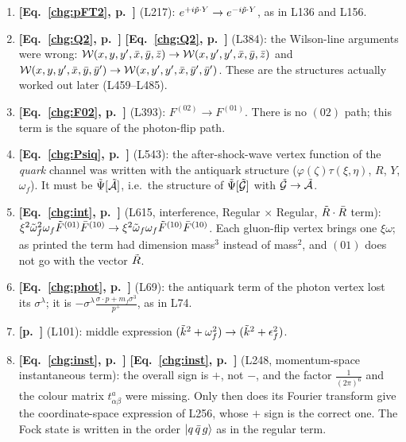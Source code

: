 \documentclass[9pt]{article}
\numberwithin{equation}{section}
\begin{document}
\begin{enumerate}
    \item \textbf{[Eq.~\eqref{chg:pFT2}, p.~\pageref{chg:pFT2}]} (L217): $e^{+i\Tilde{p}\cdot Y}\rightarrow e^{-i\Tilde{p}\cdot Y}$, as in L136 and L156.
    \item \textbf{[Eq.~\eqref{chg:Q2}, p.~\pageref{chg:Q2}]} \textbf{[Eq.~\eqref{chg:Q2}, p.~\pageref{chg:Q2}]} (L384): the Wilson-line arguments were wrong: $\mathcal{W}(x,y,y',\Bar{x},\Bar{y},\Bar{z})\rightarrow\mathcal{W}(x,y',y',\Bar{x},\Bar{y},\Bar{z})$ and $\mathcal{W}(x,y,y',\Bar{x},\Bar{y},\Bar{y}')\rightarrow\mathcal{W}(x,y',y',\Bar{x},\Bar{y}',\Bar{y}')$. These are the structures actually worked out later (L459--L485).
    \item \textbf{[Eq.~\eqref{chg:F02}, p.~\pageref{chg:F02}]} (L393): $F^{(02)}\rightarrow F^{(01)}$. There is no $(02)$ path; this term is the square of the photon-flip path.
    \item \textbf{[Eq.~\eqref{chg:Psiq}, p.~\pageref{chg:Psiq}]} (L543): the after-shock-wave vertex function of the \emph{quark} channel was written with the antiquark structure ($\varphi(\zeta)\tau(\xi,\eta)$, $R$, $Y$, $\omega_{f}$). It must be $\Tilde{\Psi}[\Tilde{\mathcal{A}}]$, i.e.\ the structure of $\Tilde{\Psi}[\Tilde{\mathcal{G}}]$ with $\Tilde{\mathcal{G}}\rightarrow\Tilde{\mathcal{A}}$.
    \item \textbf{[Eq.~\eqref{chg:int}, p.~\pageref{chg:int}]} (L615, interference, Regular $\times$ Regular, $\Tilde{R}\cdot\Bar{R}$ term): $\xi^{2}\Tilde{\omega}^{2}_{f}\omega_{f}\Tilde{F}^{(01)}\Bar{F}^{(10)}\rightarrow\xi^{2}\Tilde{\omega}_{f}\omega_{f}\Tilde{F}^{(10)}\Bar{F}^{(10)}$. Each gluon-flip vertex brings one $\xi\omega$; as printed the term had dimension mass$^{3}$ instead of mass$^{2}$, and $(01)$ does not go with the vector $\Tilde{R}$.
    \item \textbf{[Eq.~\eqref{chg:phot}, p.~\pageref{chg:phot}]} (L69): the antiquark term of the photon vertex lost its $\sigma^{\lambda}$; it is $-\sigma^{\lambda}\frac{\sigma\cdot p+m_{f}\sigma^{3}}{p^{+}}$, as in L74.
    \item \textbf{[p.~\pageref{chg:Eden}]} (L101): middle expression $(\Tilde{k}^{2}+\omega^{2}_{f})\rightarrow(\Tilde{k}^{2}+\epsilon^{2}_{f})$.
    \item \textbf{[Eq.~\eqref{chg:inst}, p.~\pageref{chg:inst}]} \textbf{[Eq.~\eqref{chg:inst}, p.~\pageref{chg:inst}]} (L248, momentum-space instantaneous term): the overall sign is $+$, not $-$, and the factor $\frac{1}{(2\pi)^{6}}$ and the colour matrix $t^{a}_{\alpha\beta}$ were missing. Only then does its Fourier transform give the coordinate-space expression of L256, whose $+$ sign is the correct one. The Fock state is written in the order $\ket{q\,\Bar{q}\,g}$ as in the regular term.
\end{enumerate}
\end{document}
